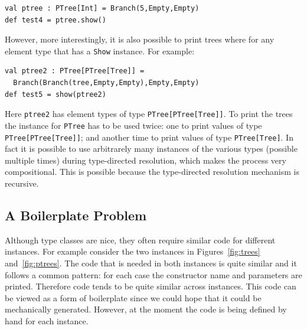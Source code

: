 \documentclass[preprint]{sigplanconf}
\begin{document}
\begin{lstlisting}
val ptree : PTree[Int] = Branch(5,Empty,Empty)
def test4 = ptree.show()
\end{lstlisting}

However, more interestingly, it is also possible to print trees where
for any element type that has a \lstinline{Show} instance. For example:

\begin{lstlisting}
val ptree2 : PTree[PTree[Tree]] =
  Branch(Branch(tree,Empty,Empty),Empty,Empty)
def test5 = show(ptree2)
\end{lstlisting}

Here \lstinline{ptree2} has element types of type
\lstinline{PTree[PTree[Tree]]}. To print the trees the instance for
\lstinline{PTree} has to be used twice: one to print values of type
\lstinline{PTree[PTree[Tree]]}; and another time to print values of
type \lstinline{PTree[Tree]}. In fact it is possible to use
arbitrarely many instances of the various types (possible multiple
times) during type-directed resolution, which makes the process very
compositional. This is possible because the type-directed resolution
mechanism is recursive.

\subsection{A Boilerplate Problem}

Although type classes are nice, they often require similar code for
different instances. For example consider the two instances
in Figures~\ref{fig:trees} and~\ref{fig:ptrees}. The code that is
needed in both instances is quite similar and it follows a common
pattern: for each case the constructor name and parameters are
printed. Therefore code tends to be quite similar across instances. This
code can be viewed as a form of boilerplate since we could hope that
it could be mechanically generated. However, at the moment the code
is being defined by hand for each instance.

\end{document}
